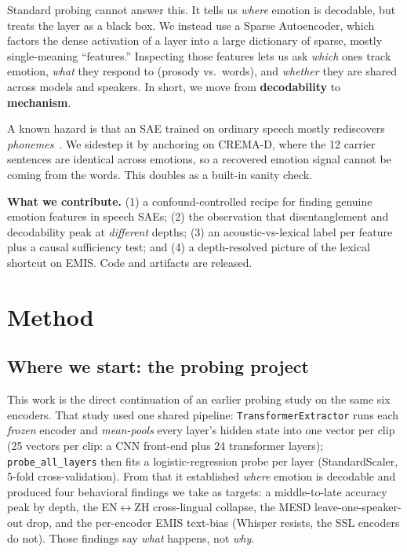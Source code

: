 \documentclass[sigconf,anonymous,nonacm]{acmart}
\begin{document}
Standard probing cannot answer this. It tells us \emph{where} emotion is decodable, but treats the layer as a black box. We instead use a Sparse Autoencoder, which factors the dense activation of a layer into a large dictionary of sparse, mostly single-meaning ``features.'' Inspecting those features lets us ask \emph{which} ones track emotion, \emph{what} they respond to (prosody vs.\ words), and \emph{whether} they are shared across models and speakers. In short, we move from \textbf{decodability} to \textbf{mechanism}.

A known hazard is that an SAE trained on ordinary speech mostly rediscovers \emph{phonemes}~\cite{saeasr2026,pluth2026asrsae}. We sidestep it by anchoring on CREMA-D, where the 12 carrier sentences are identical across emotions, so a recovered emotion signal cannot be coming from the words. This doubles as a built-in sanity check.

\noindent\textbf{What we contribute.} (1) a confound-controlled recipe for finding genuine emotion features in speech SAEs; (2) the observation that disentanglement and decodability peak at \emph{different} depths; (3) an acoustic-vs-lexical label per feature plus a causal sufficiency test; and (4) a depth-resolved picture of the lexical shortcut on EMIS. Code and artifacts are released.

\section{Method}

\subsection{Where we start: the probing project}
This work is the direct continuation of an earlier probing study on the same six encoders. That study used one shared pipeline: \texttt{TransformerExtractor} runs each \emph{frozen} encoder and \emph{mean-pools} every layer's hidden state into one vector per clip (25 vectors per clip: a CNN front-end plus 24 transformer layers); \texttt{probe\_all\_layers} then fits a logistic-regression probe per layer (StandardScaler, 5-fold cross-validation). From that it established \emph{where} emotion is decodable and produced four behavioral findings we take as targets: a middle-to-late accuracy peak by depth, the EN$\leftrightarrow$ZH cross-lingual collapse, the MESD leave-one-speaker-out drop, and the per-encoder EMIS text-bias (Whisper resists, the SSL encoders do not). Those findings say \emph{what} happens, not \emph{why}.
\end{document}
